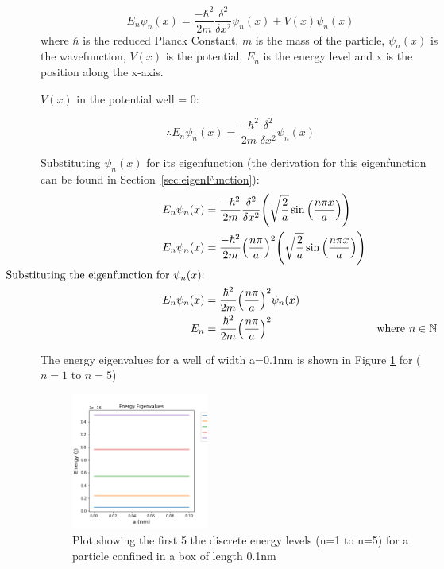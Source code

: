 $$E_n \psi_n (x) = \frac{-\hbar ^{2}}{2m}\frac{\delta^{2}}{\delta x^{2}}\psi_n (x) + V(x)\psi_n (x)$$
where $\hbar$ is the reduced Planck Constant, $m$ is the mass of the particle, $\psi_n (x)$ is the wavefunction, $V(x)$ is the potential, $E_n$ is the energy level and x is the position along the x-axis. 

$V(x)$ in the potential well = 0: 

\begin{equation} \label{eq:shrod}
\therefore E_n \psi_n (x) = \frac{-\hbar ^{2}}{2m}\frac{\delta^{2}}{\delta x^{2}}\psi_n (x)
\end{equation}

Substituting $\psi_n (x)$ for its eigenfunction (the derivation for this eigenfunction can be found in Section~\ref{sec:eigenFunction}):
\begin{align*}
E_n \psi_n (x) &= \frac{-\hbar ^{2}}{2m}\frac{\delta^{2}}{\delta x^{2}}\Bigg(\sqrt{\frac{2}{a}}\sin\Big(\frac{n\pi x}{a}\Big)\Bigg)\\
E_n \psi_n (x) &= \frac{-\hbar ^{2}}{2m}\Big(\frac{n\pi}{a}\Big)^{2}\Bigg(\sqrt{\frac{2}{a}}\sin\Big(\frac{n\pi x}{a}\Big)\Bigg)\\
\hspace{-1.2cm}\text{Substituting the eigenfunction for }\psi_n (x)\text{:}\\
E_n \psi_n (x) &= \frac{\hbar ^{2}}{2m}\Big(\frac{n\pi}{a}\Big)^{2}\psi_n (x)\\
E_n &= \frac{\hbar ^{2}}{2m}\Big(\frac{n\pi}{a}\Big)^{2} & \text{where } n \in \mathbb{N}
\end{align*}

The energy eigenvalues for a well of width a=0.1nm is shown in Figure \ref{fig:eigenEnergy} for ($n=1$ to $n=5$)

\begin{figure}[h]
    \centering
    \includegraphics[width=0.4\textwidth]{lab1/images/eigenvaluesEnergy.png}
    \caption{Plot showing the first 5 the discrete energy levels (n=1 to n=5) for a particle confined in a box of length 0.1nm} 
    \label{fig:eigenEnergy}
\end{figure}

